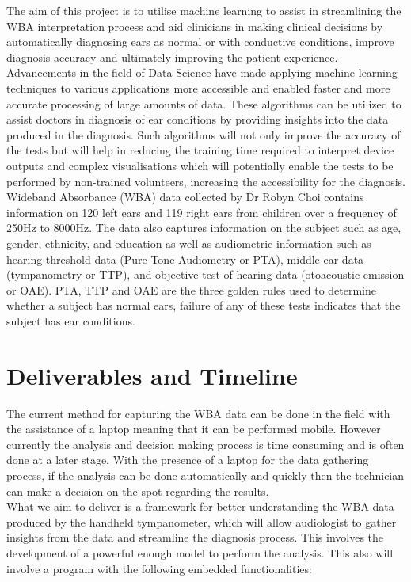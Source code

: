 \documentclass[11pt,a4paper]{article}
\begin{document}
The aim of this project is to utilise machine learning to assist in streamlining the WBA interpretation process and aid clinicians in making clinical decisions by automatically diagnosing ears as normal or with conductive conditions, improve diagnosis accuracy and ultimately improving the patient experience.  \\

Advancements in the field of Data Science have made applying machine learning techniques to various applications more accessible and enabled faster and more accurate processing of large amounts of data. These algorithms can be utilized to assist doctors in diagnosis of ear conditions by providing insights into the data produced in the diagnosis. Such algorithms will not only improve the accuracy of the tests but will help in reducing the training time required to interpret device outputs and complex visualisations which will potentially enable the tests to be performed by non-trained volunteers, increasing the accessibility for the diagnosis. \\

Wideband Absorbance (WBA) data collected by Dr Robyn Choi contains information on 120 left ears and 119 right ears from children over a frequency of 250Hz to 8000Hz. The data also captures information on the subject such as age, gender, ethnicity, and education as well as audiometric information such as hearing threshold data (Pure Tone Audiometry or PTA), middle ear data (tympanometry or TTP), and objective test of hearing data (otoacoustic emission or OAE). PTA, TTP and OAE are the three golden rules used to determine whether a subject has normal ears, failure of any of these tests indicates that the subject has ear conditions.  

\section*{Deliverables and Timeline}
The current method for capturing the WBA data can be done in the field  with the assistance of a laptop meaning that it can be performed mobile. However currently the analysis and decision making process is time consuming and is often done at a later stage. With the presence of a laptop for the data gathering process, if the analysis can be done automatically and quickly then the technician can make a decision on the spot regarding the results.\\

What we aim to deliver is a framework for better understanding the WBA data produced by the handheld tympanometer, which will allow audiologist to gather insights from the data and streamline the diagnosis process. This involves the development of a powerful enough model to perform the analysis. This also will involve a program with the following embedded functionalities: 
\end{document}
